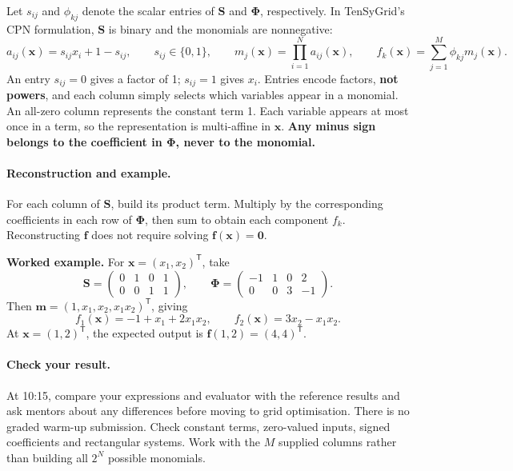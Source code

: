 \documentclass[11pt,a4paper]{article}
\begin{document}
Let $s_{ij}$ and $\phi_{kj}$ denote the scalar entries of $\mathbf{S}$ and $\boldsymbol{\Phi}$,
respectively. In TenSyGrid's CPN formulation, $\mathbf{S}$ is binary and the monomials are nonnegative:
\[
  a_{ij}(\mathbf x)=s_{ij}x_i+1-s_{ij},\qquad s_{ij}\in\{0,1\},
  \qquad m_j(\mathbf x)=\prod_{i=1}^{N}a_{ij}(\mathbf x),\qquad
  f_k(\mathbf x)=\sum_{j=1}^{M}\phi_{kj}m_j(\mathbf x).
\]
An entry $s_{ij}=0$ gives a factor of 1; $s_{ij}=1$ gives $x_i$.
Entries encode factors, \textbf{not powers}, and each column simply selects
which variables appear in a monomial. An all-zero column represents the
constant term 1. Each variable appears at most once in a term, so the
representation is multi-affine in $\mathbf x$. \textbf{Any minus sign belongs to
  the coefficient in $\boldsymbol{\Phi}$, never to the monomial.}

\paragraph{Reconstruction and example.}
For each column of $\mathbf{S}$, build its product term. Multiply by the corresponding
coefficients in each row of $\boldsymbol{\Phi}$, then sum to obtain each component $f_k$. Reconstructing $\mathbf f$ does not
require solving $\mathbf f(\mathbf x)=\mathbf 0$.

\textbf{Worked example.} For $\mathbf x=(x_1,x_2)^\mathsf T$, take
\[
  \mathbf{S}=\begin{pmatrix}0&1&0&1\\0&0&1&1\end{pmatrix},\qquad
  \boldsymbol{\Phi}=\begin{pmatrix}-1&1&0&2\\0&0&3&-1\end{pmatrix}.
\]
Then $\mathbf m=(1,x_1,x_2,x_1x_2)^\mathsf T$, giving
\[
  \boxed{\quad f_1(\mathbf x)=-1+x_1+2x_1x_2,\qquad
    f_2(\mathbf x)=3x_2-x_1x_2.\quad}
\]
At $\mathbf x=(1,2)^\mathsf T$, the expected output is $\mathbf f(1,2)=(4,4)^\mathsf T$.

\paragraph{Check your result.}
At 10:15, compare your expressions and evaluator with the reference results and
ask mentors about any differences before moving to grid optimisation. There is
no graded warm-up submission. Check constant terms, zero-valued inputs, signed
coefficients and rectangular systems. Work with the $M$ supplied columns rather than
building all $2^N$ possible monomials.
\end{document}
